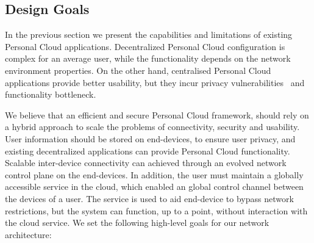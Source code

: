 \begin{itemize}
\end{itemize}

\subsection{Design Goals} \label{sec:sp-challenges}

In the previous section we present the capabilities and limitations of existing
Personal Cloud applications. Decentralized Personal Cloud configuration is
complex for an average user, while the functionality depends on the network
environment properties. On the other hand, centralised Personal Cloud
applications provide better usability, but they incur privacy
vulnerabilities~\cite{facebook-nsa} and functionality bottleneck.  

We believe that an efficient and secure Personal Cloud framework, should rely on
a hybrid approach to scale the problems of connectivity, security and usability.
User information should be stored on end-devices, to ensure user privacy, and
existing decentralized applications can provide Personal Cloud functionality.
Scalable inter-device connectivity can achieved through an evolved network
control plane on the end-devices. In addition, the user must maintain a globally
accessible service in the cloud, which enabled an global control channel between
the devices of a user. The service is used to aid end-device to bypass network
restrictions, but the system can function, up to a point, without interaction
with the cloud service. We set the following high-level goals for our network
architecture:

